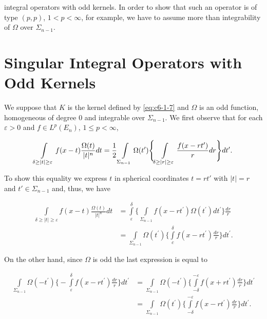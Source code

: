 integral operators with odd kernels. In order to show that such an operator is of type $(p, p)$, $1 < p < \infty$, for example, we have to assume more than integrability of $\Omega$ over $\Sigma_{n-1}$.

\section{Singular Integral Operators with Odd Kernels}

We suppose that $K$ is the kernel defined by \eqref{eq:c6-1-7} and $\Omega$ is an odd function, homogeneous of degree 0 and integrable over $\Sigma_{n-1}$. We first observe that for each $\varepsilon > 0$ and $f \in L^p(E_n)$, $1 \leq p < \infty$,

\begin{equation}\label{eq:c6-2-1}
\intop_{\substack{\delta\geq|t|\geq\varepsilon}}f(x-t)\frac{\Omega(t)}{|t|^{n}}d t=\frac12\intop_{\substack{\Sigma_{n-1}}}\Omega(t^{\prime})\Biggl\{\intop_{\substack{\delta\geq|r|\geq\varepsilon}}\frac{f(x-r t^{\prime})}{r}d r\Biggr\}d t^{\prime}.
\end{equation}

To show this equality we express $t$ in spherical coordinates $t = rt'$ with $|t| = r$ and $t' \in \Sigma_{n-1}$ and, thus, we have

\[
\begin{aligned}\int\limits_{\delta\geq|t|\geq\varepsilon}f(x-t)\frac{\Omega(t)}{|t|^{n}}dt&=\int\limits_{\varepsilon}^{\delta}\Biggl\{\int\limits_{\Sigma_{n-1}}f(x-rt^{\prime})\Omega(t^{\prime})dt^{\prime}\Biggr\}\frac{dr}{r}\\&=\int\limits_{\Sigma_{n-1}}\Omega(t^{\prime})\Biggl\{\int\limits_{c}^{\delta}f(x-rt^{\prime})\frac{dr}{r}\Biggr\}dt^{\prime}.\end{aligned}
\]

On the other hand, since $\Omega$ is odd the last expression is equal to

\[
\begin{aligned}\int\limits_{\Sigma_{n-1}}\Omega(-t^{\prime})\Biggl\{-\int\limits_{\varepsilon}^{\delta}f(x-rt^{\prime})\frac{dr}{r}\Biggr\}dt^{\prime}&=\int\limits_{\Sigma_{n-1}}\Omega(-t^{\prime})\Biggl\{\int\limits_{-\delta}^{-\varepsilon}f(x+rt^{\prime})\frac{dr}{r}\Biggr\}dt^{\prime}\\&=\int\limits_{\Sigma_{n-1}}\Omega(t^{\prime})\Biggl\{\int\limits_{-\delta}^{-\varepsilon}f(x-rt^{\prime})\frac{dr}{r}\Biggr\}dt^{\prime}.\end{aligned}
\]

